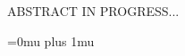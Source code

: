 \documentclass[a4paper,12pt]{article}
\begin{document}
\noindent 
ABSTRACT IN PROGRESS...

\newpage

\tableofcontents

\newpage
\setcounter{page}{1}


\newpage

\newpage

\newpage

\newpage

\newpage

\newpage

\listoffigures
\newpage
\listoftables
\newpage

\Urlmuskip=0mu plus 1mu\relax


\end{document}
